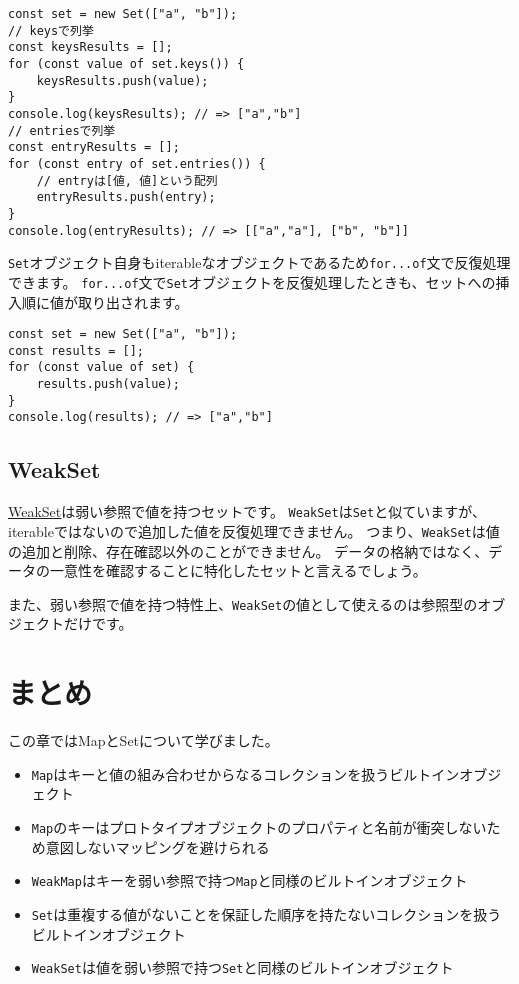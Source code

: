\begin{lstlisting}
const set = new Set(["a", "b"]);
// keysで列挙
const keysResults = [];
for (const value of set.keys()) {
    keysResults.push(value);
}
console.log(keysResults); // => ["a","b"]
// entriesで列挙
const entryResults = [];
for (const entry of set.entries()) {
    // entryは[値, 値]という配列
    entryResults.push(entry);
}
console.log(entryResults); // => [["a","a"], ["b", "b"]]
\end{lstlisting}

\texttt{Set}オブジェクト自身もiterableなオブジェクトであるため\texttt{for...of}文で反復処理できます。
\texttt{for...of}文で\texttt{Set}オブジェクトを反復処理したときも、セットへの挿入順に値が取り出されます。

\begin{lstlisting}
const set = new Set(["a", "b"]);
const results = [];
for (const value of set) {
    results.push(value);
}
console.log(results); // => ["a","b"]
\end{lstlisting}

\hypertarget{weakset}{%
\subsection{WeakSet}\label{weakset}}

\href{https://developer.mozilla.org/ja/docs/Web/JavaScript/Reference/Global_Objects/WeakSet}{WeakSet}は弱い参照で値を持つセットです。
\texttt{WeakSet}は\texttt{Set}と似ていますが、iterableではないので追加した値を反復処理できません。
つまり、\texttt{WeakSet}は値の追加と削除、存在確認以外のことができません。
データの格納ではなく、データの一意性を確認することに特化したセットと言えるでしょう。

また、弱い参照で値を持つ特性上、\texttt{WeakSet}の値として使えるのは参照型のオブジェクトだけです。

\hypertarget{conclusion}{%
\section{まとめ}\label{conclusion}}

この章ではMapとSetについて学びました。

\begin{itemize}
\item
  \texttt{Map}はキーと値の組み合わせからなるコレクションを扱うビルトインオブジェクト
\item
  \texttt{Map}のキーはプロトタイプオブジェクトのプロパティと名前が衝突しないため意図しないマッピングを避けられる
\item
  \texttt{WeakMap}はキーを弱い参照で持つ\texttt{Map}と同様のビルトインオブジェクト
\item
  \texttt{Set}は重複する値がないことを保証した順序を持たないコレクションを扱うビルトインオブジェクト
\item
  \texttt{WeakSet}は値を弱い参照で持つ\texttt{Set}と同様のビルトインオブジェクト
\end{itemize}
